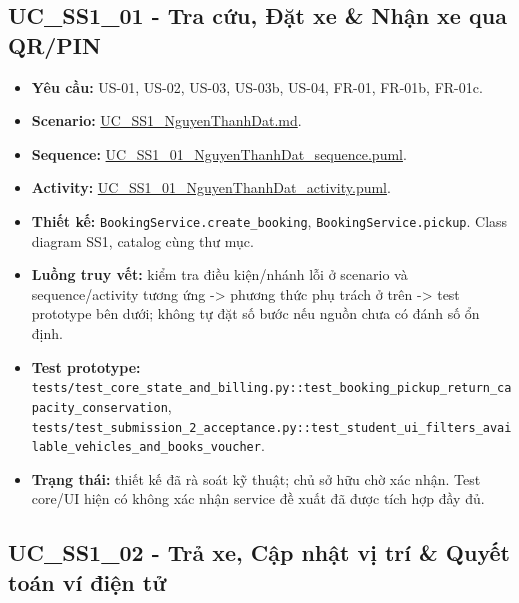 \documentclass[11pt,a4paper]{article}
\providecommand{\tightlist}{%
  \setlength{\itemsep}{0pt}\setlength{\parskip}{0pt}}
\begin{document}
\hypertarget{uc_ss1_01---tra-cux1ee9u-ux111ux1eb7t-xe-nhux1eadn-xe-qua-qrpin}{%
\subsection{UC\_SS1\_01 - Tra cứu, Đặt xe \& Nhận xe qua
QR/PIN}\label{uc_ss1_01---tra-cux1ee9u-ux111ux1eb7t-xe-nhux1eadn-xe-qua-qrpin}}

\begin{itemize}
\tightlist
\item
  \textbf{Yêu cầu:} US-01, US-02, US-03, US-03b, US-04, FR-01, FR-01b,
  FR-01c.
\item
  \textbf{Scenario:}
  \href{../../../../docs/diagrams/Use-case\%20detail-scenario/SS1/Usecase\%20scenario/UC_SS1_NguyenThanhDat.md}{UC\_SS1\_NguyenThanhDat.md}.
\item
  \textbf{Sequence:}
  \href{../../../../docs/diagrams/Use-case\%20detail-scenario/SS1/Sequence\%20diagrams/UC_SS1_01_NguyenThanhDat_sequence.puml}{UC\_SS1\_01\_NguyenThanhDat\_sequence.puml}.
\item
  \textbf{Activity:}
  \href{../../../../docs/diagrams/Use-case\%20detail-scenario/SS1/Activity\%20diagrams/UC_SS1_01_NguyenThanhDat_activity.puml}{UC\_SS1\_01\_NguyenThanhDat\_activity.puml}.
\item
  \textbf{Thiết kế:} \texttt{BookingService.create\_booking},
  \texttt{BookingService.pickup}. Class diagram SS1, catalog cùng thư
  mục.
\item
  \textbf{Luồng truy vết:} kiểm tra điều kiện/nhánh lỗi ở scenario và
  sequence/activity tương ứng -\textgreater{} phương thức phụ trách ở
  trên -\textgreater{} test prototype bên dưới; không tự đặt số bước nếu
  nguồn chưa có đánh số ổn định.
\item
  \textbf{Test prototype:}
  \texttt{tests/test\_core\_state\_and\_billing.py::test\_booking\_pickup\_return\_capacity\_conservation},
  \texttt{tests/test\_submission\_2\_acceptance.py::test\_student\_ui\_filters\_available\_vehicles\_and\_books\_voucher}.
\item
  \textbf{Trạng thái:} thiết kế đã rà soát kỹ thuật; chủ sở hữu chờ xác
  nhận. Test core/UI hiện có không xác nhận service đề xuất đã được tích
  hợp đầy đủ.
\end{itemize}

\hypertarget{uc_ss1_02---trux1ea3-xe-cux1eadp-nhux1eadt-vux1ecb-truxed-quyux1ebft-touxe1n-vuxed-ux111iux1ec7n-tux1eed}{%
\subsection{UC\_SS1\_02 - Trả xe, Cập nhật vị trí \& Quyết toán ví điện
tử}\label{uc_ss1_02---trux1ea3-xe-cux1eadp-nhux1eadt-vux1ecb-truxed-quyux1ebft-touxe1n-vuxed-ux111iux1ec7n-tux1eed}}
\end{document}
